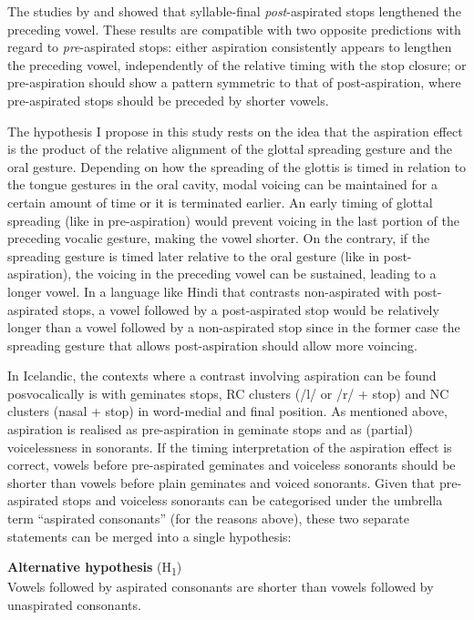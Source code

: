 \documentclass[11pt,a4paper,openany]{memoir}\usepackage[]{graphicx}\usepackage[]{color}
\begin{document}
The studies by \citet{maddieson1976} and \citet{durvasula2012} showed that syllable-final \textit{post}-aspirated stops lengthened the preceding vowel.
These results are compatible with two opposite predictions with regard to \textit{pre}-aspirated stops: either aspiration consistently appears to lengthen the preceding vowel, independently of the relative timing with the stop closure; or pre-aspiration should show a pattern symmetric to that of post-aspiration, where pre-aspirated stops should be preceded by shorter vowels.

The hypothesis I propose in this study rests on the idea that the aspiration effect is the product of the relative alignment of the glottal spreading gesture and the oral gesture.
Depending on how the spreading of the glottis is timed in relation to the tongue gestures in the oral cavity, modal voicing can be maintained for a certain amount of time or it is terminated earlier.
An early timing of glottal spreading (like in pre-aspiration) would prevent voicing in the last portion of the preceding vocalic gesture, making the vowel shorter.
On the contrary, if the spreading gesture is timed later relative to the oral gesture (like in post-aspiration), the voicing in the preceding vowel can be sustained, leading to a longer vowel.
In a language like Hindi that contrasts non-aspirated with post-aspirated stops, a vowel followed by a post-aspirated stop would be relatively longer than a vowel followed by a non-aspirated stop since in the former case the spreading gesture that allows post-aspiration should allow more voincing.

In Icelandic, the contexts where a contrast involving aspiration can be found posvocalically is with geminates stops, RC clusters (/l/ or /r/ + stop) and NC clusters (nasal + stop) in word-medial and final position.
As mentioned above, aspiration is realised as pre-aspiration in geminate stops and as (partial) voicelessness in sonorants.
If the timing interpretation of the aspiration effect is correct, vowels before pre-aspirated geminates and voiceless sonorants should be shorter than vowels before plain geminates and voiced sonorants.
Given that pre-aspirated stops and voiceless sonorants can be categorised under the umbrella term ``aspirated consonants'' (for the reasons above), these two separate statements can be merged into a single hypothesis:

\begin{exe}
\ex\label{h1} \textbf{Alternative hypothesis} (H\textsubscript{1}) \\
Vowels followed by aspirated consonants are shorter than vowels followed by unaspirated consonants.
\end{exe}
\end{document}
